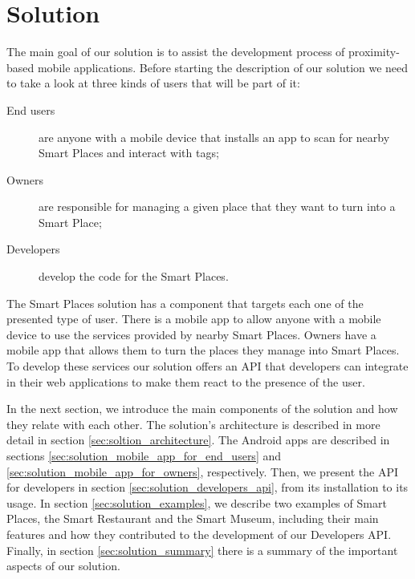 
\chapter{Solution}
\label{chapter:solution}
The main goal of our solution is to assist
the development process of proximity-based mobile applications.
Before starting the description of our solution we need to take a look at three kinds of users that will be part of it:
\begin{description}
  \item[End users] are anyone with a mobile device that installs an app to scan for nearby Smart Places and interact with tags;
  \item[Owners] are responsible for managing a given place that they want to turn into a Smart Place;
  \item[Developers] develop the code for the Smart Places.
\end{description}

The Smart Places solution has a component that targets each one of the presented type of user.
There is a mobile app to allow anyone with a mobile device to use the services provided by nearby Smart Places.
Owners have a mobile app that allows them to turn the places they manage into Smart Places.
To develop these services our solution offers an \gls{API} that developers can integrate in their web applications to make them react to the presence of the user.

In the next section, we introduce the main components of the solution and how they relate with each other.
The solution's architecture is described in more detail in section \ref{sec:soltion_architecture}.
The Android apps are described in sections \ref{sec:solution_mobile_app_for_end_users} and \ref{sec:solution_mobile_app_for_owners}, respectively.
Then, we present the \gls{API} for developers in section \ref{sec:solution_developers_api}, from its installation to its usage.
In section \ref{sec:solution_examples}, we describe two examples of Smart Places, the Smart Restaurant and the Smart Museum, including their main features and how they contributed to the development of our Developers \gls{API}.
Finally, in section \ref{sec:solution_summary} there is a summary of the important aspects of our solution.

